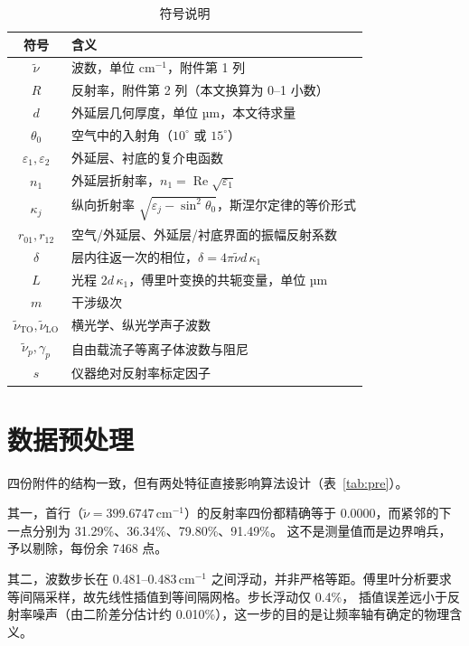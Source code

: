 \documentclass[12pt]{article}
\begin{document}
\begin{table}[!htbp]
  \centering
  \caption{符号说明}
  \begin{tabular}{cl}
    \toprule
    符号 & 含义 \\
    \midrule
    $\tilde\nu$ & 波数，单位 cm$^{-1}$，附件第 1 列 \\
    $R$ & 反射率，附件第 2 列（本文换算为 0--1 小数） \\
    $d$ & 外延层几何厚度，单位 µm，本文待求量 \\
    $\theta_0$ & 空气中的入射角（$10^\circ$ 或 $15^\circ$） \\
    $\varepsilon_1,\varepsilon_2$ & 外延层、衬底的复介电函数 \\
    $n_1$ & 外延层折射率，$n_1=\operatorname{Re}\sqrt{\varepsilon_1}$ \\
    $\kappa_j$ & 纵向折射率 $\sqrt{\varepsilon_j-\sin^2\theta_0}$，斯涅尔定律的等价形式 \\
    $r_{01},r_{12}$ & 空气/外延层、外延层/衬底界面的振幅反射系数 \\
    $\delta$ & 层内往返一次的相位，$\delta=4\pi\tilde\nu d\,\kappa_1$ \\
    $L$ & 光程 $2d\,\kappa_1$，傅里叶变换的共轭变量，单位 µm \\
    $m$ & 干涉级次 \\
    $\tilde\nu_{\mathrm{TO}},\tilde\nu_{\mathrm{LO}}$ & 横光学、纵光学声子波数 \\
    $\tilde\nu_p,\gamma_p$ & 自由载流子等离子体波数与阻尼 \\
    $s$ & 仪器绝对反射率标定因子 \\
    \bottomrule
  \end{tabular}
\end{table}

\section{数据预处理}

四份附件的结构一致，但有两处特征直接影响算法设计（表~\ref{tab:pre}）。

其一，首行（$\tilde\nu=399.6747$\,cm$^{-1}$）的反射率四份都精确等于
$0.0000$，而紧邻的下一点分别为
31.29\%、36.34\%、79.80\%、91.49\%。
这不是测量值而是边界哨兵，予以剔除，每份余 7468 点。

其二，波数步长在 0.481--0.483\,cm$^{-1}$
之间浮动，并非严格等距。傅里叶分析要求等间隔采样，故先线性插值到等间隔网格。步长浮动仅 0.4\%，
插值误差远小于反射率噪声（由二阶差分估计约 0.010\%），这一步的目的是让频率轴有确定的物理含义。
\end{document}
